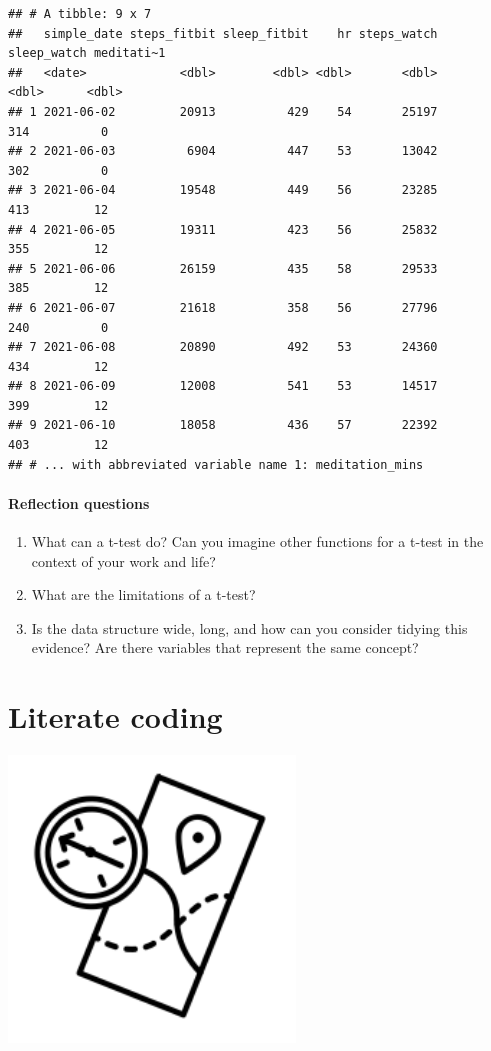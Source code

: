 \documentclass[
]{book}
\providecommand{\tightlist}{%
  \setlength{\itemsep}{0pt}\setlength{\parskip}{0pt}}
\begin{document}
\begin{verbatim}
## # A tibble: 9 x 7
##   simple_date steps_fitbit sleep_fitbit    hr steps_watch sleep_watch meditati~1
##   <date>             <dbl>        <dbl> <dbl>       <dbl>       <dbl>      <dbl>
## 1 2021-06-02         20913          429    54       25197         314          0
## 2 2021-06-03          6904          447    53       13042         302          0
## 3 2021-06-04         19548          449    56       23285         413         12
## 4 2021-06-05         19311          423    56       25832         355         12
## 5 2021-06-06         26159          435    58       29533         385         12
## 6 2021-06-07         21618          358    56       27796         240          0
## 7 2021-06-08         20890          492    53       24360         434         12
## 8 2021-06-09         12008          541    53       14517         399         12
## 9 2021-06-10         18058          436    57       22392         403         12
## # ... with abbreviated variable name 1: meditation_mins
\end{verbatim}

\hypertarget{reflection-questions}{%
\subsubsection*{Reflection questions}\label{reflection-questions}}

\begin{enumerate}
\def\labelenumi{\arabic{enumi}.}
\tightlist
\item
  What can a t-test do? Can you imagine other functions for a t-test in the context of your work and life?
\item
  What are the limitations of a t-test?
\item
  Is the data structure wide, long, and how can you consider tidying this evidence? Are there variables that represent the same concept?
\end{enumerate}

\hypertarget{coding}{%
\chapter{Literate coding}\label{coding}}

\includegraphics[width=3in,height=\textheight]{./coding.png}
\end{document}
